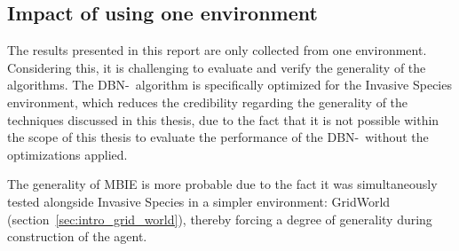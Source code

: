 \subsection{Impact of using one environment}
\label{sec:impact_of_one_env}

The results presented in this report are only collected from one environment.
Considering this, it is challenging to evaluate and verify the generality of the
algorithms. The DBN-\etre\ algorithm is specifically optimized for the Invasive Species
environment, which reduces the credibility regarding the generality of the
techniques discussed in this thesis, due to the fact that it is not possible
within the scope of this thesis to evaluate the performance of the DBN-\etre\,
without the optimizations applied. 

The generality of MBIE is more probable due to the fact it was simultaneously
tested alongside Invasive Species in a simpler environment: GridWorld
(section~\ref{sec:intro_grid_world}), thereby forcing a degree of generality during
construction of the agent.
